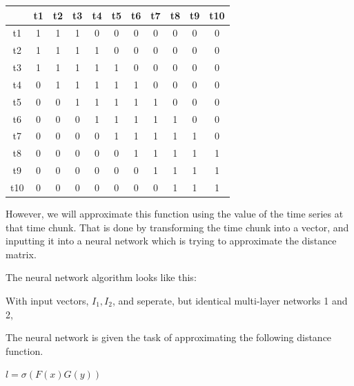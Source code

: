 \documentclass{article}
\begin{document}
\begin{tabular}{|c|c|c|c|c|c|c|c|c|c|c|}
	\hline 
	& t1 & t2 & t3 & t4 & t5 & t6 & t7 & t8 & t9 & t10\\ \hline 
	t1 & 1 & 1 & 1 & 0 & 0 & 0 & 0 & 0 & 0 & 0\\ \hline 
	t2 & 1 & 1 & 1 & 1 & 0 & 0 & 0 & 0 & 0 & 0\\ \hline 
	t3 & 1 & 1 & 1 & 1 & 1 & 0 & 0 & 0 & 0 & 0\\ \hline 
	t4 & 0 & 1 & 1 & 1 & 1 & 1 & 0 & 0 & 0 & 0\\ \hline 
	t5 & 0 & 0 & 1 & 1 & 1 & 1 & 1 & 0 & 0 & 0\\ \hline 
	t6 & 0 & 0 & 0 & 1 & 1 & 1 & 1 & 1 & 0 & 0\\ \hline 
	t7 & 0 & 0 & 0 & 0 & 1 & 1 & 1 & 1 & 1 & 0\\ \hline 
	t8 & 0 & 0 & 0 & 0 & 0 & 1 & 1 & 1 & 1 & 1\\ \hline 
	t9 & 0 & 0 & 0 & 0 & 0 & 0 & 1 & 1 & 1 & 1\\ \hline 
	t10 & 0 & 0 & 0 & 0 & 0 & 0 & 0 & 1 & 1 & 1\\ \hline 
\end{tabular}

However, we will approximate this function using the value of the time series at that time chunk. That is done by transforming the time chunk into a vector, and inputting it into a neural network which is trying to approximate the distance matrix. 

The neural network algorithm looks like this:

With input vectors, $I_1, I_2$, and seperate, but identical multi-layer networks 1 and 2, 	


%


The neural network is given the task of approximating the following distance function. 


$l = \sigma(F(x) G(y))$


{}

\end{document}
